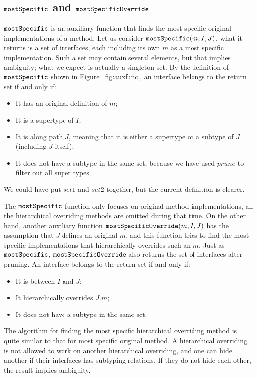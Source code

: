 \subsection{$\texttt{mostSpecific}$ and $\texttt{mostSpecificOverride}$}

$\texttt{mostSpecific}$ is an auxiliary function that finds the most specific original implementations of a method. Let us consider $\texttt{mostSpecific}(m, I, J)$, what it returns is a set of interfaces, each including its own $m$ as a most specific implementation. Such a set may contain several elements, but that implies ambiguity; what we expect is actually a singleton set. By the definition of $\texttt{mostSpecific}$ shown in Figure~\ref{fig:auxfunc}, an interface belongs to the return set if and only if:
\begin{itemize}
    \item It has an original definition of $m$;
    \item It is a supertype of $I$;
    \item It is along path $J$, meaning that it is either a supertype or a subtype of $J$ (including $J$ itself);
    \item It does not have a subtype in the same set, because we have used $prune$ to filter out all super types.
\end{itemize}
We could have put $set1$ and $set2$ together, but the current
definition is clearer.

The $\texttt{mostSpecific}$ function only focuses on original method implementations, all the hierarchical overriding methods are omitted during that time. On the other hand, another auxiliary function $\texttt{mostSpecificOverride}(m, I, J)$ has the assumption that $J$ defines an original $m$, and this function tries to find the most specific implementations that hierarchically overrides such an $m$. Just as $\texttt{mostSpecific}$, $\texttt{mostSpecificOverride}$ also returns the set of interfaces after pruning. An interface belongs to the return set if and only if:
\begin{itemize}
    \item It is between $I$ and $J$;
    \item It hierarchically overrides $J.m$;
    \item It does not have a subtype in the same set.
\end{itemize}
The algorithm for finding the most specific hierarchical overriding method is quite similar to that for most specific original method. A hierarchical overriding is not allowed to work on another hierarchical overriding, and one can hide another if their interfaces has subtyping relations. If they do not hide each other, the result implies ambiguity.


